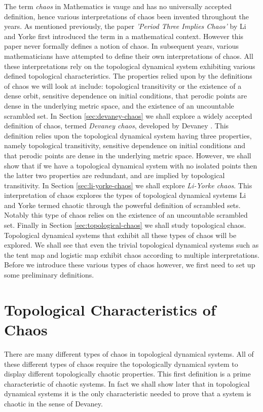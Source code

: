 The term \emph{chaos} in Mathematics is vauge and has no universally accepted definition, hence various interpretations of chaos been invented throughout the years. As mentioned previously, the paper \emph{'Period Three Implies Chaos'} by Li and Yorke \cite{li-yorke} first introduced the term in a mathematical context. However this paper never formally defines a notion of chaos. In subsequent years, various mathematicians have attempted to define their own interpretations of chaos. All these interpretations rely on the topological dynamical system exhibiting various defined topological characteristics. The properties relied upon by the definitions of chaos we will look at include: topological transitivity or the existence of a dense orbit, sensitive dependence on initial conditions, that perodic points are dense in the underlying metric space, and the existence of an uncountable scrambled set. In Section \ref{sec:devaney-chaos} we shall explore a widely accepted definition of chaos, termed \emph{Devaney chaos}, developed by Devaney \cite{devaney}. This definition relies upon the topological dynamical system having three properties, namely topological transitivity, sensitive dependence on initial conditions and that perodic points are dense in the underlying metric space. However, we shall show that if we have a topological dynamical system with no isolated points then the latter two properties are redundant, and are implied by topological transitivity. In Section \ref{sec:li-yorke-chaos} we shall explore \emph{Li-Yorke chaos}. This interpretation of chaos explores the types of topological dynamical systems Li and Yorke termed chaotic through the powerful definition of scrambled sets. Notably this type of chaos relies on the existence of an uncountable scrambled set. Finally in Section \ref{sec:topological-chaos} we shall study topological chaos. Topological dynamical systems that exhibit all these types of chaos will be explored. We shall see that even the trivial topological dynamical systems such as the tent map and logistic map exhibit chaos according to multiple interpretations. Before we introduce these various types of chaos however, we first need to set up some preliminary definitions.

\section{Topological Characteristics of Chaos} \label{sec:characteristics-of-chaos}

There are many different types of chaos in topological dynamical systems. All of these different types of chaos require the topologically dynamical system to display different topologically chaotic properties.
This first definition is a prime characteristic of chaotic systems. In fact we shall show later that in topological dynamical systems it is the only characteristic needed to prove that a system is chaotic in the sense of Devaney.

